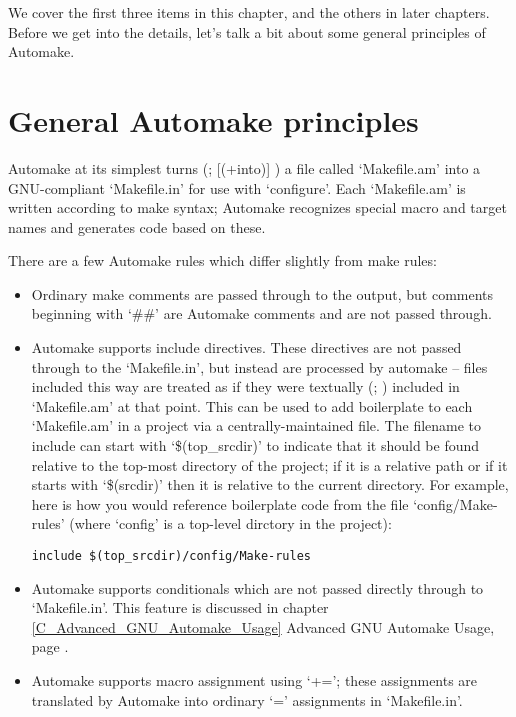 We cover the first three items in this chapter, and the others in later 
chapters.
Before we get into the details, let's talk a bit about some 
general principles of Automake. 

\section{General Automake principles}

Automake at its simplest turns ({\MaQ{}}; {\MaQ{}} [(+into)] ) a file called `Makefile.am' into a 
GNU-compliant `Makefile.in' for use with `configure'. Each `Makefile.am' is 
written according to make syntax; Automake recognizes special macro and target 
names and generates code based on these. 

There are a few Automake rules which differ slightly from make rules: 

\begin{itemize}
\item Ordinary make comments are passed through to the output, but comments 
beginning with `\#\#' are Automake comments and are not passed through. 

\item Automake supports include directives. These directives are not passed 
through to the `Makefile.in', but instead are processed by automake -- files 
included this way are treated as if they were textually ({\MbQ{}}; {\MaQ{}})
included 
in `Makefile.am' at that point. This can be used to add boilerplate to 
each `Makefile.am' in a project via a centrally-maintained file. The filename 
to include can start with `\$(top\_{}srcdir)' to indicate that it should be 
found relative to the top-most directory of the project; if it is a 
relative path or if it starts with `\$(srcdir)' then it is relative to 
the current directory. For example, here is how you would reference 
boilerplate code from the file `config/Make-rules' (where `config' is a 
top-level dirctory in the project): 

\begin{Verbatim}[frame=single]
include $(top_srcdir)/config/Make-rules
\end{Verbatim}



\item Automake supports conditionals which are not passed directly through 
to `Makefile.in'. This feature is discussed 
in chapter \ref{C_Advanced_GNU_Automake_Usage} Advanced GNU Automake Usage,
page \pageref{C_Advanced_GNU_Automake_Usage}. 

\item Automake supports macro assignment using `+='; these assignments are translated by Automake into ordinary `=' assignments in `Makefile.in'.

\end{itemize}

